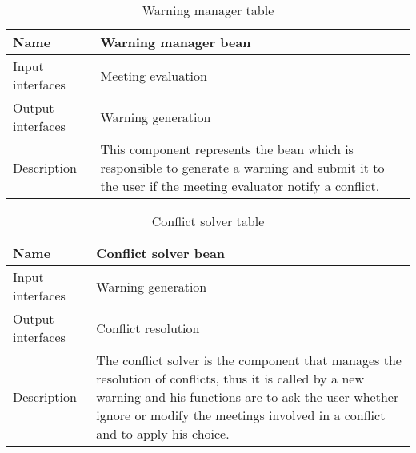 \begin{flushleft}
	
	\begin{table}[htp]
		
		\begin{tabular}{l|p{7cm}}
		
			Name&\textbf{Warning manager bean}\\
			\hline
			\hline
			Input interfaces& Meeting evaluation\\
			\hline
			Output interfaces& Warning generation\\
			\hline
			Description&This component represents the bean which is responsible to generate a warning and submit it to the user if the meeting evaluator notify a conflict. \\
			\hline
				
		\end{tabular}
		
		\caption{Warning manager table } 
		\label{tab:warningmanagertable}
		
	\end{table}
	
\end{flushleft}

\begin{flushleft}
	
	\begin{table}[htp]
		
		\begin{tabular}{l|p{7cm}}
		
			Name&\textbf{Conflict solver bean}\\
			\hline
			\hline
			Input interfaces& Warning generation\\
			\hline
			Output interfaces& Conflict resolution\\
			\hline
			Description&The conflict solver is the component that manages the resolution of conflicts, thus it is called by a new warning and his functions are to ask the user whether ignore or modify the meetings involved in a conflict and to apply his choice. \\
			\hline
			
		\end{tabular}
		
		\caption{Conflict solver table } 
		\label{tab:conflictsolvertable}
		
	\end{table}
	
\end{flushleft}


